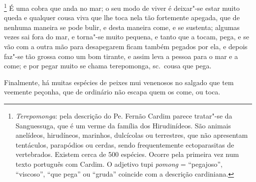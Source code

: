 \begin{linenumbers}
\footnote{ \textit{Terepomonga}: pela descrição
do Pe. Fernão Cardim parece tratar"-se da Sanguessuga, que é um verme da
família dos Hirudinídeos. São animais anelídeos, hirudíneos, marinhos,
dulcícolas ou terrestres, que não apresentam tentáculos, parapódios ou
cerdas, sendo frequentemente ectoparasitas de vertebrados. Existem
cerca de 500 espécies. Ocorre pela primeira vez num texto português com
Cardim. O adjetivo tupi \textit{pomong} = ``pegajoso'', ``viscoso'', ``que
pega'' ou ``gruda'' coincide com a descrição cardiniana.} É uma
cobra que anda no mar; o seu modo de viver é deixar"-se estar muito
queda e qualquer cousa viva que lhe toca nela tão fortemente apegada,
que de nenhuma maneira se pode bulir, e desta maneira come, e se
sustenta; algumas vezes sai fora do mar, e torna"-se muito pequena, e
tanto que a tocam, pega, e se vão com a outra mão para desapegarem
ficam também pegados por ela, e depois faz"-se tão grossa como um bom
tirante, e assim leva a pessoa para o mar e a come; e por pegar muito
se chama terepomonga, sc.~cousa que pega. 

 Finalmente, há muitas espécies de peixes mui venenosos no salgado que
tem veemente peçonha, que de ordinário não escapa quem os come, ou toca.


\end{linenumbers}
